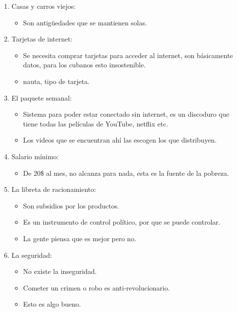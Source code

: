 \begin{enumerate}
    \item Casas y carros viejos:
        \begin{itemize}
            \item Son antigüedades que se mantienen solas.
        \end{itemize}
    
    \item Tarjetas de internet: 
        \begin{itemize}
            \item Se necesita comprar tarjetas para acceder al internet, son básicamente datos, para los cubanos esto insostenible.
            \item nauta, tipo de tarjeta.
        \end{itemize}
    
    \item El paquete semanal: 
        \begin{itemize}
            \item Sistema para poder estar conectado sin internet, es un discoduro que tiene todas las películas de YouTube, netflix etc.
            \item Los videos que se encuentran ahí las escogen los que distribuyen.
        \end{itemize}
    
    \item Salario mínimo: 
        \begin{itemize}
            \item De 20\$ al mes, no alcanza para nada, esta es la fuente de la pobreza.
        \end{itemize}
    
    \item La libreta de racionamiento: 
        \begin{itemize}
            \item Son subsidios por los productos.
            \item Es un instrumento de control político, por que se puede controlar.
            \item La gente piensa que es mejor pero no.
        \end{itemize}
    
    \item La seguridad: 
        \begin{itemize}
            \item No existe la inseguridad.
            \item Cometer un crimen o robo es anti-revolucionario.
            \item Esto es algo bueno.
        \end{itemize}
    

\end{enumerate}
